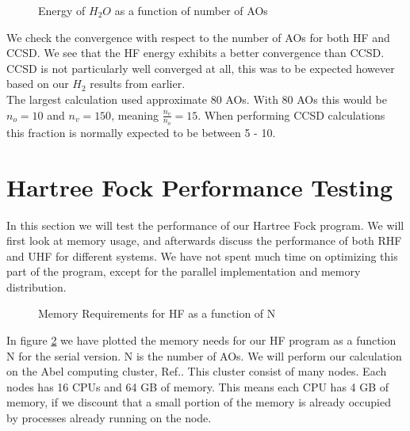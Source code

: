 \begin{figure}[h!]
\begin{center}
\caption{Energy of $H_2O$ as a function of number of AOs}
\label{fig:convplot}
\end{center}
\end{figure} 

We check the convergence with respect to the number of AOs for both HF
and CCSD. We see that the HF energy exhibits a  better convergence than CCSD. CCSD
is not particularly well converged at all, this was to be expected
however based on our $H_2$ results from earlier. \\

The largest calculation used approximate 80 AOs. With 80 AOs this
would be $n_o = 10$ and $n_v = 150$, meaning $\frac{n_v}{n_o} =
15$. When performing CCSD calculations this fraction is normally
expected to be between 5 - 10.

\section{Hartree Fock Performance Testing}
In this section we will test the performance of our Hartree Fock
program. We will first look at memory usage, and afterwards discuss
the performance of both RHF and UHF for different systems. We have not
spent much time on optimizing this part of the program, except for the
parallel implementation and memory distribution. \\

\begin{figure}[h!]
\begin{center}
\caption{Memory Requirements for HF as a function of N}
\label{fig:memory_needs}
\end{center}
\end{figure}

In figure \ref{fig:memory_needs} we have plotted the memory needs for
our HF program as a function N for the serial version. N is the number
of AOs. We will perform our calculation on the Abel computing cluster,
Ref.\cite{abel_po_g_citation1234567}. This cluster consist of many 
nodes. Each nodes has 16 CPUs and 64 GB of memory. This means each CPU
has 4 GB of memory, if we discount that a small portion of the memory
is already occupied by processes already running on the node. \\

